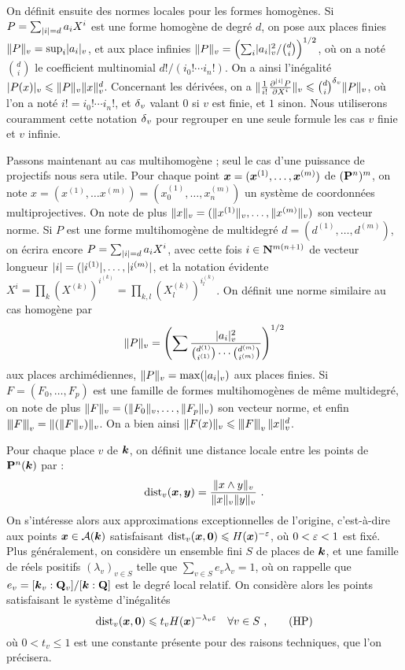 \documentclass{mpg-preth}
\begin{document}
On définit ensuite des normes locales pour les formes homogènes. Si $P =
\sum_{\lvert i\rvert =d} a_i X^i$ est une forme homogène de degré $d$, on pose aux
places finies $\lVert P\rVert_{v} = \sup_i \lvert a_i\rvert_{v}$, et aux place infinies $\lVert P\rVert_{v} =
\left( \sum_i \lvert a_i\rvert_{v}^2/\binom{d}{i} \right)^{1/2}$, où on a noté
$\binom{d}{i}$ le coefficient multinomial $d!/(i_0!\cdots i_n!)$. On a ainsi
l'inégalité $\lvert P(x)\rvert_{v} \leqslant \lVert P\rVert_{v} \lVert x\rVert_{v}^d$. Concernant les dérivées, on a
$\lVert\frac{1}{i!}\frac{\partial^{\lvert i\rvert}P}{\partial X^i}\rVert_{v} \leqslant \binom{d}{i}^{\delta\smash{_v}}
\lVert P\rVert_{v}$, où l'on a noté $i! = i_0! \cdots i_n!$, et ${\delta\smash{_v}}$ valant $0$ si $v$
est finie, et $1$ sinon. Nous utiliserons couramment cette notation ${\delta\smash{_v}}$ pour
regrouper en une seule formule les cas $v$ finie et $v$ infinie.

Passons maintenant au cas multihomogène ; seul le cas d'une puissance de
projectifs nous sera utile. Pour chaque point ${\boldsymbol{x}} = ({\boldsymbol{x}}^{(1)}, \dots,
{\boldsymbol{x}}^{(m)})$ de $({\mathbf{P}}^n)^m$, on note $x = (x^{(1)}, \dots x^{(m)}) =
(x_0^{(1)}, \dots, x_n^{(m)})$ un système de coordonnées multiprojectives. On
note de plus $\lVert x\rVert_{v} = (\lVert x^{(1)}\rVert_{v},\dots, \lVert x^{(m)}\rVert_{v})$ son vecteur norme.
Si $P$ est une forme multihomogène de multidegré $d= (d^{(1)}, \dots,
d^{(m)})$, on écrira encore $P = \sum_{\lvert i\rvert=d} a_i X^i$, avec cette fois $i
\in {\mathbf{N}}^{m(n+1)}$ de vecteur longueur $\lvert i\rvert = (|i^{(1)}|, \dots, |i^{(m)}|$,
et la notation évidente $X^i = \prod_{k} (X^{(k)})^{i^{(k)}} = \prod_{k, l}
(X_l^{(k)})^{i_l^{(k)}}$. On définit une norme similaire au cas homogène par
\[
  \lVert P\rVert_{v} = \left( \sum \frac{ \lvert a_i\rvert_{v}^2}{\binom{d^{(1)}}{i^{(1)}} \cdots
  \binom{d^{(m)}}{i^{(m)}} } \right)^{1/2}
\]
aux places archimédiennes, $\lVert P\rVert_{v} = \max(\lvert a_i\rvert_{v})$ aux places finies. Si
$F = (F_0, \dots, F_p)$ est une famille de formes multihomogènes de même
multidegré, on note de plus $\lVert F\rVert_{v} = (\lVert F_0\rVert_{v}, \dots, \lVert F_p\rVert_{v})$ son vecteur
norme, et enfin $\left\lvert\hspace{-1pt}\left\lvert\hspace{-1pt} \left\lvert F\right\rvert \hspace{-1pt}\right\rvert\hspace{-1pt}\right\rvert_{v} = \lVert(\lVert F\rVert_{v})\rVert_{v}$. On a bien ainsi $\lVert F(x)\rVert_{v} \leqslant
\left\lvert\hspace{-1pt}\left\lvert\hspace{-1pt} \left\lvert F\right\rvert \hspace{-1pt}\right\rvert\hspace{-1pt}\right\rvert_{v}\lVert x\rVert_{v}^d$.

Pour chaque place $v$ de $\boldsymbol{k}$, on définit une distance locale entre les
points de ${\mathbf{P}}^n(\boldsymbol{k})$ par :
\[
  \mathrm{dist}_v({\boldsymbol{x}}, {\boldsymbol{y}}) = \frac{\lVert x\wedge y \rVert_{v}}{\lVert x\rVert_{v}\lVert y\rVert_{v}}\text{ .}
\]
On s'intéresse alors aux approximations exceptionnelles de l'origine,
c'est-à-dire aux points ${\boldsymbol{x}} \in \mathcal{A}(\boldsymbol{k})$ satisfaisant $\mathrm{dist}_v({\boldsymbol{x}}, {\boldsymbol{0}}) \leqslant
H({\boldsymbol{x}})^{-\varepsilon}$, où $0<\varepsilon<1$ est fixé.  Plus généralement, on considère un
ensemble fini $S$ de places de $\boldsymbol{k}$, et une famille de réels positifs
$(\lambda_v)_{v\in S}$ telle que $\sum_{v\in S} e_v \lambda_v = 1$, où on
rappelle que $e_v = [\boldsymbol{k}_v : {\mathbf{Q}}_v]/[\boldsymbol{k} : {\mathbf{Q}}]$ est le degré local relatif.
On considère alors les points satisfaisant le système d'inégalités
\[
  \mathrm{dist}_v({\boldsymbol{x}}, {\boldsymbol{0}}) \leqslant t_v H({\boldsymbol{x}})^{-\lambda_v \varepsilon} \quad
  \forall v \in S \text{ ,} \tag{HP} \label{hyp}
\]
où $0<t_v\le 1$ est une constante présente pour des raisons techniques, que
l'on précisera.
\end{document}

